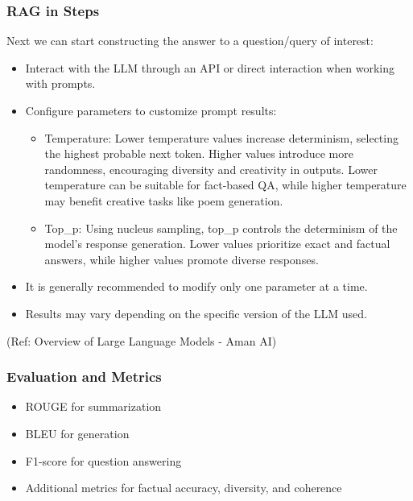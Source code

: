 \begin{frame}[fragile]\frametitle{RAG in Steps}

Next we can start constructing the answer to a question/query of interest:

\begin{itemize}
\item Interact with the LLM through an API or direct interaction when working with prompts.
\item Configure parameters to customize prompt results:

\begin{itemize}
\item Temperature: Lower temperature values increase determinism, selecting the highest probable next token. Higher values introduce more randomness, encouraging diversity and creativity in outputs. Lower temperature can be suitable for fact-based QA, while higher temperature may benefit creative tasks like poem generation.
\item Top\_p: Using nucleus sampling, top\_p controls the determinism of the model's response generation. Lower values prioritize exact and factual answers, while higher values promote diverse responses.
\end{itemize}

\item It is generally recommended to modify only one parameter at a time.
\item Results may vary depending on the specific version of the LLM used.
\end{itemize}

{\tiny (Ref: Overview of Large Language Models - Aman AI)}

\end{frame}

\begin{frame}[fragile]\frametitle{Evaluation and Metrics}

\begin{itemize}
\item ROUGE for summarization
\item BLEU for generation
\item F1-score for question answering
\item Additional metrics for factual accuracy, diversity, and coherence
\end{itemize}	

\end{frame}


